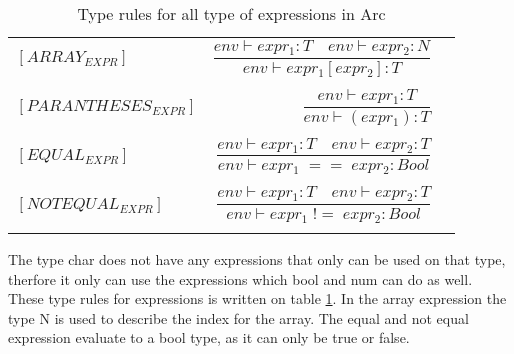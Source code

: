 \begin{table}[htb!]
    \centering
    \begin{tabular}{lr>{\raggedright\arraybackslash}p{6cm}}
        $[ARRAY_{EXPR}]$       & $ \dfrac
            {env\vdash expr_1: T \quad env \vdash expr_2 : N}
            {env\vdash expr_1[expr_2] : T}$
        \\
        \\
        $[PARANTHESES_{EXPR}]$ & $ \dfrac
            {env\vdash expr_1: T}
            {env\vdash (expr_1) : T}$
        \\
        \\
        $[EQUAL_{EXPR}] $      & $\dfrac
            {env\vdash expr_1: T \quad env\vdash expr_2: T}
            {env\vdash expr_1 \;== \;expr_2: Bool}$
        \\
        \\
        $[NOTEQUAL_{EXPR}] $   & $\dfrac
        {env\vdash expr_1: T \quad env\vdash expr_2: T}
        {env\vdash expr_1 \;!= \;expr_2: Bool}$
    \\
    \\
    \end{tabular}
    \caption{Type rules for all type of expressions in Arc}
    \label{tab:expr-rules}
\end{table}

The type char does not have any expressions that only can be used on that type, therfore it only can use the expressions which bool and num can do as well. These type rules for expressions is written on table \ref*{tab:expr-rules}. In the array expression the type N is used to describe the index for the array. The equal and not equal expression evaluate to a bool type, as it can only be true or false.

